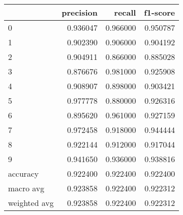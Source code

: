 \begin{tabular}{lrrr}
\toprule
 & precision & recall & f1-score \\
\midrule
0 & 0.936047 & 0.966000 & 0.950787 \\
1 & 0.902390 & 0.906000 & 0.904192 \\
2 & 0.904911 & 0.866000 & 0.885028 \\
3 & 0.876676 & 0.981000 & 0.925908 \\
4 & 0.908907 & 0.898000 & 0.903421 \\
5 & 0.977778 & 0.880000 & 0.926316 \\
6 & 0.895620 & 0.961000 & 0.927159 \\
7 & 0.972458 & 0.918000 & 0.944444 \\
8 & 0.922144 & 0.912000 & 0.917044 \\
9 & 0.941650 & 0.936000 & 0.938816 \\
accuracy & 0.922400 & 0.922400 & 0.922400 \\
macro avg & 0.923858 & 0.922400 & 0.922312 \\
weighted avg & 0.923858 & 0.922400 & 0.922312 \\
\bottomrule
\end{tabular}
